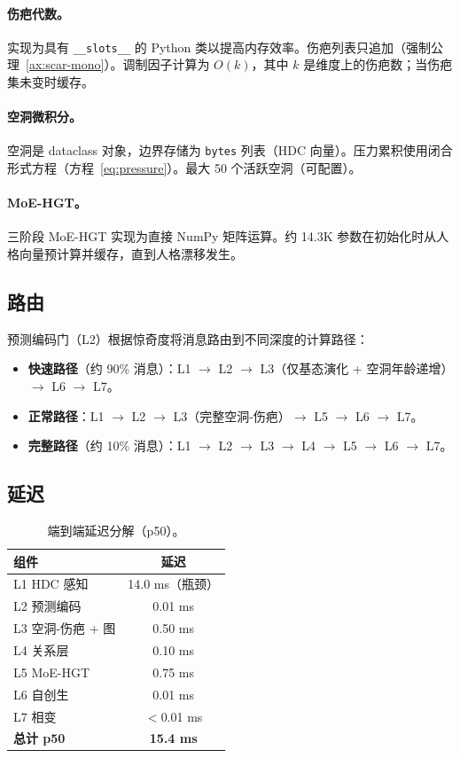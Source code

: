 \documentclass[11pt]{article}
\begin{document}
\paragraph{伤疤代数。}实现为具有 \texttt{\_\_slots\_\_} 的 Python 类以提高内存效率。伤疤列表只追加（强制公理~\ref{ax:scar-mono}）。调制因子计算为 $O(k)$，其中 $k$ 是维度上的伤疤数；当伤疤集未变时缓存。

\paragraph{空洞微积分。}空洞是 dataclass 对象，边界存储为 \texttt{bytes} 列表（HDC 向量）。压力累积使用闭合形式方程（方程~\ref{eq:pressure}）。最大 50 个活跃空洞（可配置）。

\paragraph{MoE-HGT。}三阶段 MoE-HGT 实现为直接 NumPy 矩阵运算。约 14.3K 参数在初始化时从人格向量预计算并缓存，直到人格漂移发生。

\subsection{路由}

预测编码门（L2）根据惊奇度将消息路由到不同深度的计算路径：
\begin{itemize}
\item \textbf{快速路径}（约 90\% 消息）：L1 $\to$ L2 $\to$ L3（仅基态演化 + 空洞年龄递增）$\to$ L6 $\to$ L7。
\item \textbf{正常路径}：L1 $\to$ L2 $\to$ L3（完整空洞-伤疤）$\to$ L5 $\to$ L6 $\to$ L7。
\item \textbf{完整路径}（约 10\% 消息）：L1 $\to$ L2 $\to$ L3 $\to$ L4 $\to$ L5 $\to$ L6 $\to$ L7。
\end{itemize}

\subsection{延迟}

\begin{table}[H]
\centering
\caption{端到端延迟分解（p50）。}
\label{tab:latency}
\begin{tabular}{lc}
\toprule
\textbf{组件} & \textbf{延迟} \\
\midrule
L1 HDC 感知 & 14.0 ms（瓶颈） \\
L2 预测编码 & 0.01 ms \\
L3 空洞-伤疤 + 图 & 0.50 ms \\
L4 关系层 & 0.10 ms \\
L5 MoE-HGT & 0.75 ms \\
L6 自创生 & 0.01 ms \\
L7 相变 & $<$0.01 ms \\
\midrule
\textbf{总计 p50} & \textbf{15.4 ms} \\
\bottomrule
\end{tabular}
\end{table}
\end{document}
